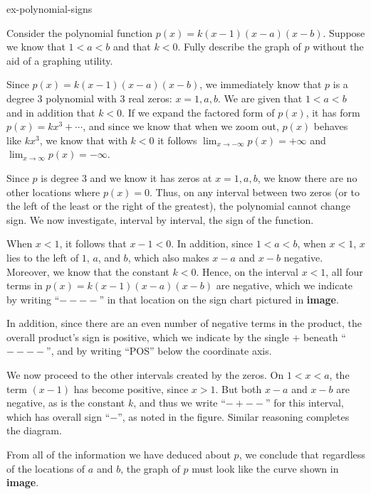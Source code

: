 \documentclass{ximera}
\begin{document}
\begin{example}{}{ex-polynomial-signs}%

Consider the polynomial function $p(x) = k(x-1)(x-a)(x-b)$.  Suppose we know that $1 \lt a \lt b$ and that $k \lt 0$.  Fully describe the graph of $p$ without the aid of a graphing utility.%

Since $p(x) = k(x-1)(x-a)(x-b)$, we immediately know that $p$ is a degree $3$ polynomial with $3$ real zeros:  $x = 1, a, b$.  We are given that $1 \lt a \lt b$ and in addition that $k \lt 0$.  If we expand the factored form of $p(x)$, it has form $p(x) = kx^3 + \cdots$, and since we know that when we zoom out, $p(x)$ behaves like $kx^3$, we know that with $k \lt 0$ it follows $\lim_{x \to -\infty} p(x) = +\infty$ and $\lim_{x \to \infty} p(x) = -\infty$.%

Since $p$ is degree $3$ and we know it has zeros at $x = 1, a, b$, we know there are no other locations where $p(x) = 0$.  Thus, on any interval between two zeros (or to the left of the least or the right of the greatest), the polynomial cannot change sign.  We now investigate, interval by interval, the sign of the function.%


When $x \lt 1$, it follows that $x - 1 \lt 0$.  In addition, since $1 \lt a \lt b$, when $x \lt 1$, $x$ lies to the left of $1$, $a$, and $b$, which also makes $x-a$ and $x-b$ negative.  Moreover, we know that the constant $k \lt 0$.  Hence, on the interval $x \lt 1$, all four terms in $p(x) = k(x-1)(x-a)(x-b)$ are negative, which we indicate by writing ``$----$'' in that location on the sign chart pictured in \textbf{image}.%

In addition, since there are an even number of negative terms in the product, the overall product's sign is positive, which we indicate by the single $+$ beneath ``$----$'', and by writing ``POS'' below the coordinate axis.%

We now proceed to the other intervals created by the zeros.  On $1 \lt x \lt a$, the term $(x-1)$ has become positive, since $x \gt 1$.  But both $x-a$ and $x-b$ are negative, as is the constant $k$, and thus we write ``$-+--$'' for this interval, which has overall sign ``$-$'', as noted in the figure.  Similar reasoning completes the diagram.%

From all of the information we have deduced about $p$, we conclude that regardless of the locations of $a$ and $b$, the graph of $p$ must look like the curve shown in \textbf{image}.%

\end{example}
\end{document}
